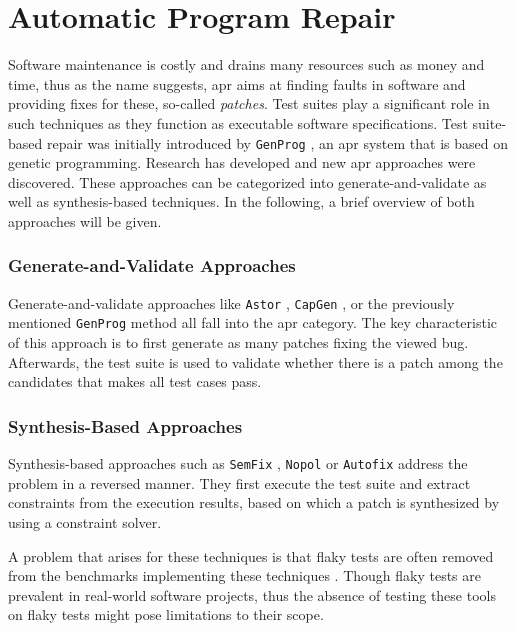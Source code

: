 \documentclass[
fancyheadings, %
%
%
]{stsreprt}
\begin{document}
\section{Automatic Program Repair}
Software maintenance is costly and drains many resources such as money and time, thus as the name suggests, \acrshort{apr} aims at finding faults in software and providing fixes for these, so-called \textit{patches}. 
Test suites play a significant role in such techniques as they function as executable software specifications. 
Test suite-based repair was initially introduced by \texttt{GenProg} \cite{genprog:2012}, an \acrshort{apr} system that is based on genetic programming.
Research has developed and new \acrshort{apr} approaches were discovered. 
These approaches can be categorized into generate-and-validate as well as synthesis-based techniques. 
In the following, a brief overview of both approaches will be given.
\subsubsection{Generate-and-Validate Approaches}
Generate-and-validate approaches like \texttt{Astor} \cite{astor:2019}, \texttt{CapGen} \cite{capgen:2018}, or the previously mentioned \texttt{GenProg} method all fall into the \acrshort{apr} category. 
The key characteristic of this approach is to first generate as many patches fixing the viewed bug. 
Afterwards, the test suite is used to validate whether there is a patch among the candidates that makes all test cases pass. 
\subsubsection{Synthesis-Based Approaches}
Synthesis-based approaches such as \texttt{SemFix} \cite{semfix:2013}, \texttt{Nopol} \cite{nopol:2017} or \texttt{Autofix} \cite{autofix:2014} address the problem in a reversed manner. 
They first execute the test suite and extract constraints from the execution results, based on which a patch is synthesized by using a constraint solver. \cite{apr-benchmark-quixbugs:2021} \par
A problem that arises for these techniques is that flaky tests are often removed from the benchmarks implementing these techniques \cite{flaky-impact-repair:2021}.
Though flaky tests are prevalent in real-world software projects, thus the absence of testing these tools on flaky tests might pose limitations to their scope. 
\end{document}
